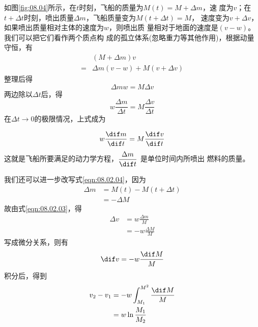 \documentclass[../outline-of-mechanics.tex]{subfiles}
\begin{document}
如图\ref{fig:08.04}所示，在$ t $时刻，飞船的质量为$ M \left( t \right) = M + \Delta m $，速
度为$ v $；在$ t + \Delta t $时刻，喷出质量$ \Delta m $，飞船质量变为$ M \left( t + \Delta t \right) = M $，
速度变为$ v + \Delta v $，如果喷出质量相对主体的速度为$ w $，则喷出质
量相对于地面的速度是$ \left( v - w \right) $。我们可以把它们看作两个质点构
成的孤立体系(忽略重力等其他作用)，根据动量守恒，有
\begin{equation*}
  \begin{split}
    & \left( M + \Delta m \right) v \\
    = & \Delta m \left( v - w \right) + M \left( v + \Delta v \right)
  \end{split}
\end{equation*}
整理后得
\begin{equation}\label{eqn:08.02.03}
  \Delta m w = M \Delta v
\end{equation}
两边除以$ \Delta t $后，得
\begin{equation*}
  w \frac { \Delta m } { \Delta t } = M \frac { \Delta v } { \Delta t }
\end{equation*}
在$ \Delta t \to 0 $的极限情况，上式成为

\mbox{}\vspace{-1.5em}
\begin{equation}\label{eqn:08.02.04}
  w \frac { \dif m } { \dif t } = M \frac { \dif v } { \dif t }
\end{equation}
这就是飞船所要满足的动力学方程，$ \dfrac { \Delta m } { \dif t } $
是单位时间内所喷出
燃料的质量。

我们还可以进一步改写式\eqref{eqn:08.02.04}，因为
\begin{equation*}
  \begin{split}
    \Delta m & = M \left( t \right) - M \left( t + \Delta t \right) \\
    & = - \Delta M
  \end{split}
\end{equation*}
故由式\eqref{eqn:08.02.03}，得
\begin{equation*}
  \begin{split}
    \Delta v &= w \frac { \Delta m } { M } \\
    & = - w \frac { \Delta M } { M }
  \end{split}
\end{equation*}
写成微分关系，则有
\begin{equation*}
  \dif v = - w \frac { \dif M } { M }
\end{equation*}
积分后，得到
\begin{equation*}
  \begin{split}
    v _ { 2 } - v _ { 1 } & = - w \int _ { M _ { 1 } } ^ { M ^ { 2 } } \frac { \dif M } { M } \\
    & = w \ln \frac { M _ { 1 } } { M _ { 2 } }
  \end{split}
\end{equation*}
\end{document}

